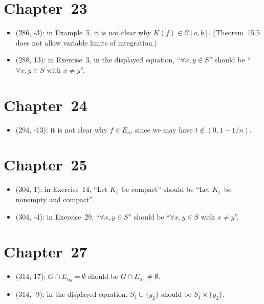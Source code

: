 \documentclass[letterpaper,12pt]{article}
\newcommand{\C}{\mathcal{C}}
\newcommand{\union}{\cup}
\newcommand{\sect}{\cap}
\begin{document}
\section*{Chapter~23}
\begin{itemize}
\item (286, -3): in Example~5, it is not clear why \(K(f)\in\C[a,b]\). (Theorem~15.5 does not allow variable limits of integration.)
\item (288, 13): in Exercise~3, in the displayed equation, ``\(\forall x,y\in S\)'' should be ``\(\forall x,y\in S\) with \(x\ne y\)''.
\end{itemize}

\section*{Chapter~24}
\begin{itemize}
\item (294, -13): it is not clear why \(f\in E_n\), since we may have \(t\not\in(0,1-1/n)\).
\end{itemize}

\section*{Chapter~25}
\begin{itemize}
\item (304, 1): in Exercise~14, ``Let \(K_i\)~be compact'' should be ``Let \(K_i\)~be nonempty and compact''.
\item (304, -4): in Exercise~29, ``\(\forall x,y\in S\)'' should be ``\(\forall x,y\in S\) with \(x\ne y\)''.
\end{itemize}

\section*{Chapter~27}
\begin{itemize}
\item (314, 17): \(G\sect E_{\alpha_0}=\emptyset\) should be \(G\sect E_{\alpha_0}\ne\emptyset\).
\item (314, -9): in the displayed equation, \(S_1\union\{y_2\}\) should be \(S_1\times\{y_2\}\).
\end{itemize}
\end{document}
